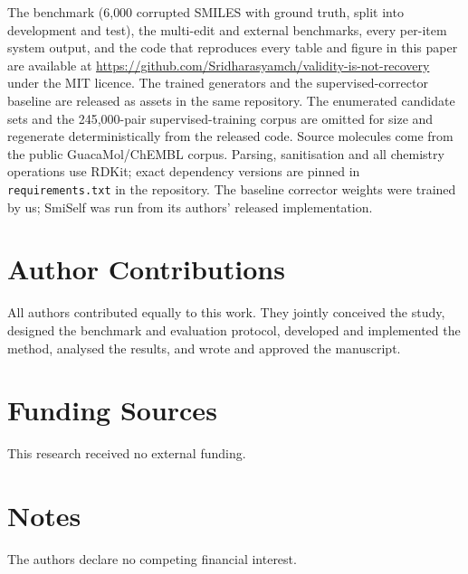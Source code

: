 \documentclass[journal=jcisd8,manuscript=article]{achemso}
\begin{document}
The benchmark (6{,}000 corrupted SMILES with ground truth, split into development
and test), the multi-edit and external benchmarks, every per-item system output,
and the code that reproduces every table and figure in this paper are available at
\url{https://github.com/Sridharasyamch/validity-is-not-recovery} under the MIT
licence. The trained generators and the supervised-corrector baseline are released
as assets in the same repository. The enumerated candidate sets and the
245{,}000-pair supervised-training corpus are omitted for size and regenerate
deterministically from the released code. Source molecules come from the public
GuacaMol/ChEMBL corpus. Parsing, sanitisation and all chemistry operations use
RDKit; exact dependency versions are pinned in \texttt{requirements.txt} in the
repository. The baseline corrector weights were trained by us; SmiSelf was run
from its authors' released implementation.

\section*{Author Contributions}

All authors contributed equally to this work. They jointly conceived the study,
designed the benchmark and evaluation protocol, developed and implemented the
method, analysed the results, and wrote and approved the manuscript.

\section*{Funding Sources}

This research received no external funding.

\section*{Notes}

The authors declare no competing financial interest.


\end{document}
